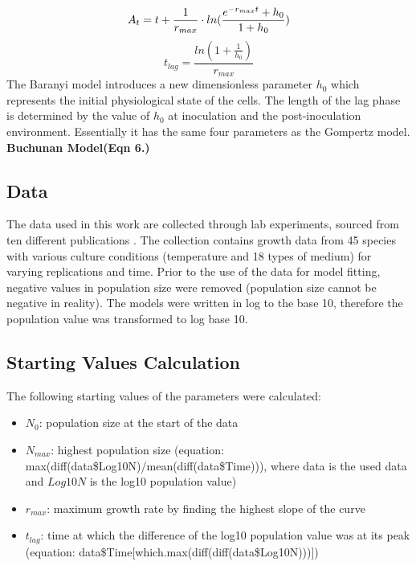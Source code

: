 \documentclass[a4paper,11pt]{article}
\theoremstyle{definition}
\begin{document}
\begin{equation}
    A_t = t + \frac{1}{r_{max}}\cdot ln(\frac{e^{-r_{max}t}+h_0}{1+h_0})\\
\end{equation}
\begin{equation}
    t_{lag} = \frac{ln(1+\frac{1}{h_0})}{r_{max}}
\end{equation}
The Baranyi model introduces a new dimensionless parameter $h_0$ which represents the initial physiological state of the cells. The length of the lag phase is determined by the value of $h_0$ at inoculation and the post-inoculation environment. Essentially it has the same four parameters as the Gompertz model.\\
\textbf{Buchunan Model(Eqn 6.)}

\subsection{Data}
The data used in this work are collected through lab experiments, sourced from ten different publications \citep{bae2014growth,bernhardt2018metabolic,galarz2016predicting,gill1991growth,phillips1987relation,roth1962continuity,silva2018modelling,sivonen1990effects, stannard1985temperature,zwietering1994modeling}. The collection contains growth data from 45 species with various culture conditions (temperature and 18 types of medium) for varying replications and time. Prior to the use of the data for model fitting, negative values in population size were removed (population size cannot be negative in reality). The models were written in log to the base 10, therefore the population value was transformed to log base 10.

\subsection{Starting Values Calculation}
The following starting values of the parameters were calculated:
\begin{itemize}
	\item $N_0$: population size at the start of the data
    \item $N_{max}$: highest population size (equation: max(diff(data\$Log10N)/mean(diff(data\$Time))), where data is the used data and $Log10N$ is the log10 population value)
    \item $r_{max}$: maximum growth rate by finding the highest slope of the curve
	\item $t_{lag}$: time at which the difference of the log10 population value was at its peak (equation: data\$Time[which.max(diff(diff(data\$Log10N)))])
\end{itemize}
\end{document}
